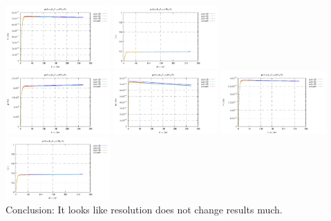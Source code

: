 \begin{center}
\includegraphics[width=4cm]{python_codes/fieldstone_126/results/model1/pt4_v.pdf}
\includegraphics[width=4cm]{python_codes/fieldstone_126/results/model1/pt4_Ovp.pdf}\\
\includegraphics[width=4cm]{python_codes/fieldstone_126/results/model1/pt5_p.pdf}
\includegraphics[width=4cm]{python_codes/fieldstone_126/results/model1/pt5_u.pdf}
\includegraphics[width=4cm]{python_codes/fieldstone_126/results/model1/pt5_v.pdf}
\includegraphics[width=4cm]{python_codes/fieldstone_126/results/model1/pt5_Ovp.pdf}\\
{\captionfont Conclusion: It looks like resolution does not change results much.}
\end{center}






